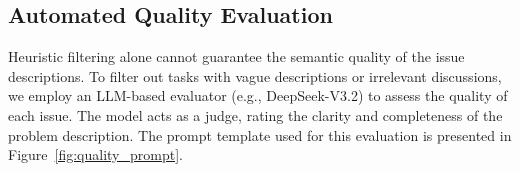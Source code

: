 \documentclass{article}
\theoremstyle{plain}
\theoremstyle{definition}
\theoremstyle{remark}
\begin{document}
\begin{table}[h]
\centering
\caption{Filtering criteria for Repositories and Instances.}\label{tab:filter_rules}
\end{table}

\subsection{Automated Quality Evaluation}
Heuristic filtering alone cannot guarantee the semantic quality of the issue descriptions. To filter out tasks with vague descriptions or irrelevant discussions, we employ an LLM-based evaluator (e.g., DeepSeek-V3.2) to assess the quality of each issue. The model acts as a judge, rating the clarity and completeness of the problem description. The prompt template used for this evaluation is presented in Figure~\ref{fig:quality_prompt}.
\end{document}
